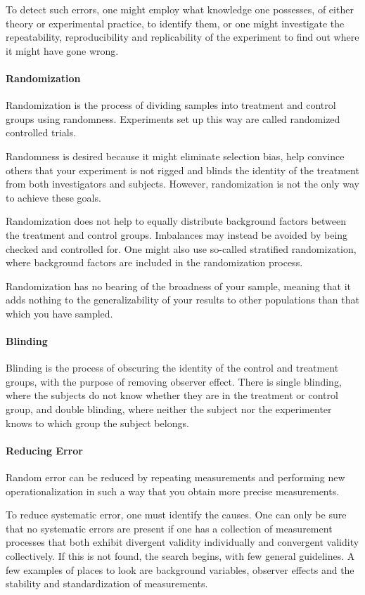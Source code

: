To detect such errors, one might employ what knowledge one possesses, of either theory or experimental practice, to identify them, or one might investigate the repeatability, reproducibility and replicability of the experiment to find out where it might have gone wrong.

\paragraph{Randomization}
Randomization is the process of dividing samples into treatment and control groups using randomness. Experiments set up this way are called randomized controlled trials.

Randomness is desired because it might eliminate selection bias, help convince others that your experiment is not rigged and blinds the identity of the treatment from both investigators and subjects. However, randomization is not the only way to achieve these goals.

Randomization does not help to equally distribute background factors between the treatment and control groups. Imbalances may instead be avoided by being checked and controlled for. One might also use so-called stratified randomization, where background factors are included in the randomization process.

Randomization has no bearing of the broadness of your sample, meaning that it adds nothing to the generalizability of your results to other populations than that which you have sampled.

\paragraph{Blinding}
Blinding is the process of obscuring the identity of the control and treatment groups, with the purpose of removing observer effect. There is single blinding, where the subjects do not know whether they are in the treatment or control group, and double blinding, where neither the subject nor the experimenter knows to which group the subject belongs.

\paragraph{Reducing Error}
Random error can be reduced by repeating measurements and performing new operationalization in such a way that you obtain more precise measurements.

To reduce systematic error, one must identify the causes. One can only be sure that no systematic errors are present if one has a collection of measurement processes that both exhibit divergent validity individually and convergent validity collectively. If this is not found, the search begins, with few general guidelines. A few examples of places to look are background variables, observer effects and the stability and standardization of measurements.

